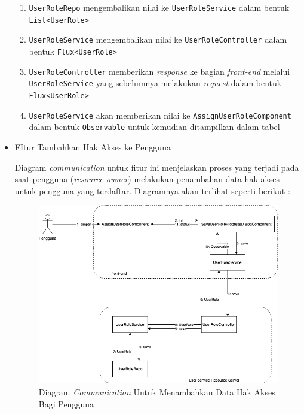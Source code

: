 \documentclass[pdftex,12pt, oneside]{article}
\begin{document}
\begin{itemize}
\begin{enumerate}
		\item \texttt{UserRoleRepo} mengembalikan nilai ke \texttt{UserRoleService} dalam bentuk \texttt{List<UserRole>}
		
		\item \texttt{UserRoleService} mengembalikan nilai ke \texttt{UserRoleController} dalam bentuk \texttt{Flux<UserRole>}
		
		\item \texttt{UserRoleController} memberikan \textit{response} ke bagian \textit{front-end} melalui \texttt{UserRoleService} yang sebelumnya melakukan \textit{request} dalam bentuk \texttt{Flux<UserRole>}
		
		\item \texttt{UserRoleService} akan memberikan nilai ke \texttt{AssignUserRoleComponent} dalam bentuk \texttt{Observable} untuk kemudian ditampilkan dalam tabel
	\end{enumerate}
	
	\item FItur Tambahkan Hak Akses ke Pengguna
	
	Diagram \textit{communication} untuk fitur ini menjelaskan proses yang terjadi pada saat pengguna (\textit{resource owner}) melakukan penambahan data hak akses untuk pengguna yang terdaftar. Diagramnya akan terlihat seperti berikut :
	
	\begin{figure}[H]
		\centering
		\includegraphics[width=1\textwidth]{./resources/comm-dia-add-user-role}
		\caption{Diagram \textit{Communication} Untuk Menambahkan Data Hak Akses Bagi Pengguna}
		\label{fig:comm-dia-add-user-role}
	\end{figure}
	

\end{itemize}
\end{document}
